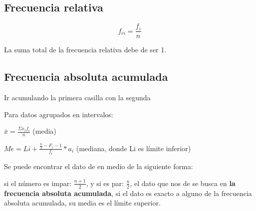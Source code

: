 \documentclass[letterpaper,12pt]{article}
\begin{document}
\subsection{Frecuencia relativa}
$$f_{ri} = \frac{f_i}{n}$$

La suma total de la frecuencia relativa debe de ser 1.

\subsection{Frecuencia absoluta acumulada}
Ir acumulando la primera casilla con la segunda 

Para datos agrupados en intervalos:

$\displaystyle \bar{x} = \frac{\Sigma x_{i}f_{i}}{n}$ (media)

$\displaystyle Me = Li + \frac{\frac{n}{2}- F_i -1}{f_i} * a_i$ (mediana, donde Li es límite inferior)

Se puede encontrar el dato de en medio de la siguiente forma: 

si el número es impar: $\displaystyle \frac{n+1}{2}$, y si es par: $\displaystyle \frac{n}{2}$, el dato que nos de se busca en \textbf{la frecuencia absoluta acumulada}, si el dato es exacto a alguno de la frecuencia absoluta acumulada, su media es el límite superior.
\end{document}

